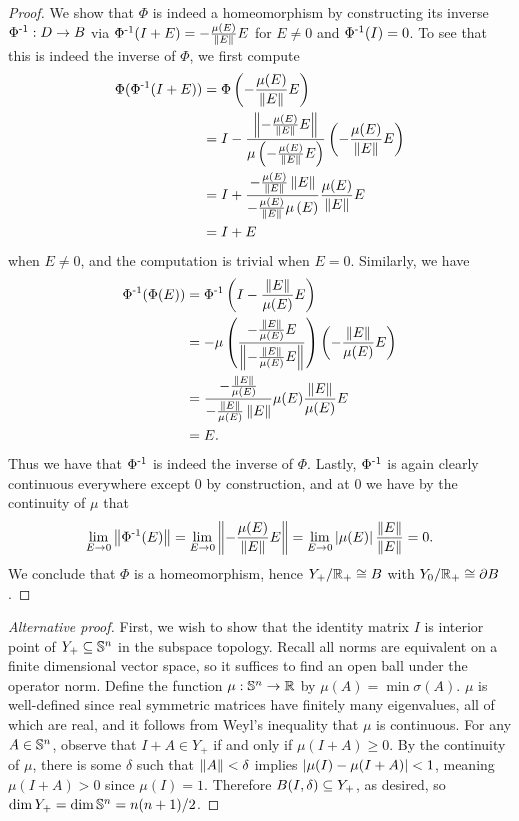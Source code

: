 \begin{proposition}
\begin{proof}
        We show that $\Phi$ is indeed a homeomorphism by constructing its inverse $\inv{\Phi} : D \to B$ via $\inv{\Phi}(I + E) = -\f{\mu(E)}{\norm{E}} E$ for $E \neq 0$ and $\inv{\Phi}(I) = 0$.
        To see that this is indeed the inverse of $\Phi$, we first compute
        \begin{align*}
            \Phi(\inv{\Phi}(I + E))
            &= \Phi\bigp{-\f{\mu(E)}{\norm{E}}E} \\
            &= I - \f{\norm{-\f{\mu(E)}{\norm{E}}E}}{\mu\bigp{-\f{\mu(E)}{\norm{E}}E}}\bigp{-\f{\mu(E)}{\norm{E}} E} \\
            &= I + \f{-\f{\mu(E)}{\norm{E}}\norm{E}}{-\f{\mu(E)}{\norm{E}}\mu\bigp{E}}\f{\mu(E)}{\norm{E}} E \\
            &= I + E
        \end{align*}
        when $E \neq 0$, and the computation is trivial when $E = 0$.
        Similarly, we have
        \begin{align*}
            \inv{\Phi}(\Phi(E))
            &= \inv{\Phi}\bigp{I - \f{\norm{E}}{\mu(E)} E} \\
            &= -\mu\bigp{\f{-\f{\norm{E}}{\mu(E)} E}{\norm{-\f{\norm{E}}{\mu(E)} E}}}\bigp{-\f{\norm{E}}{\mu(E)} E} \\
            &= \f{-\f{\norm{E}}{\mu(E)}}{-\f{\norm{E}}{\mu(E)} \norm{E}} \mu(E) \f{\norm{E}}{\mu(E)} E \\
            &= E.
        \end{align*}
        Thus we have that $\inv{\Phi}$ is indeed the inverse of $\Phi$.
        Lastly, $\inv{\Phi}$ is again clearly continuous everywhere except $0$ by construction, and at $0$ we have by the continuity of $\mu$ that
        \[
            \lim_{E \to 0} \norm{\inv{\Phi}(E)}
            = \lim_{E \to 0} \norm{-\f{\mu(E)}{\norm{E}} E}
            = \lim_{E \to 0} \abs{\mu(E)} \f{\norm{E}}{\norm{E}}
            = 0.
        \]
        We conclude that $\Phi$ is a homeomorphism, hence $Y_+/\Rp \cong B$ with $Y_0/\Rp \cong \bdry B$.
    \end{proof}
    \begin{proof}[Alternative proof]
        First, we wish to show that the identity matrix $I$ is interior point of $Y_+ \sub \S^n$ in the subspace topology.
        Recall all norms are equivalent on a finite dimensional vector space, so it suffices to find an open ball under the operator norm.
        Define the function $\mu : \S^n \to \R$ by $\mu(A) = \min \sigma(A)$.
        $\mu$ is well-defined since real symmetric matrices have finitely many eigenvalues, all of which are real, and it follows from Weyl's inequality that $\mu$ is continuous.
        For any $A \in \S^n$, observe that $I + A \in Y_+$ if and only if $\mu(I + A) \geq 0$.
        By the continuity of $\mu$, there is some $\delta$ such that $\norm{A} < \delta$ implies $\abs{\mu(I) - \mu(I + A)} < 1$, meaning $\mu(I+A) > 0$ since $\mu(I) = 1$.
        Therefore $B(I,\delta) \sub Y_+$, as desired, so $\dim Y_+ = \dim \S^n = n(n+1)/2$.
        

\end{proof}
\end{proposition}
